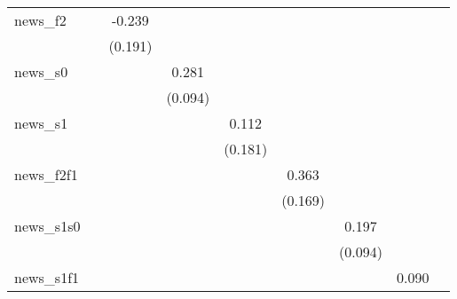 {\begin{tabular}{l*{8}{c}}
news\_f2     &                     &      -0.239         &                     &                     &                     &                     &                     &                     \\
            &                     &     (0.191)         &                     &                     &                     &                     &                     &                     \\
\addlinespace
news\_s0     &                     &                     &       0.281\sym{***}&                     &                     &                     &                     &                     \\
            &                     &                     &     (0.094)         &                     &                     &                     &                     &                     \\
\addlinespace
news\_s1     &                     &                     &                     &       0.112         &                     &                     &                     &                     \\
            &                     &                     &                     &     (0.181)         &                     &                     &                     &                     \\
\addlinespace
news\_f2f1   &                     &                     &                     &                     &       0.363\sym{**} &                     &                     &                     \\
            &                     &                     &                     &                     &     (0.169)         &                     &                     &                     \\
\addlinespace
news\_s1s0   &                     &                     &                     &                     &                     &       0.197\sym{**} &                     &                     \\
            &                     &                     &                     &                     &                     &     (0.094)         &                     &                     \\
\addlinespace
news\_s1f1   &                     &                     &                     &                     &                     &                     &       0.090         &                     \\

\end{tabular}}
